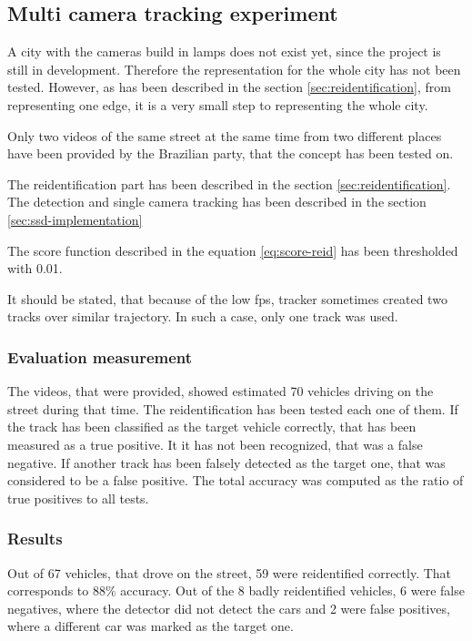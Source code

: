 \documentclass[a4paper,12pt,titlepage, twoside]{article}
\numberwithin{figure}{section}
\begin{document}
\subsection{Multi camera tracking experiment}
\label{sec:multi-camera-tracking}

A city with the cameras build in lamps does not exist yet, since the project is still in development. Therefore the representation for the whole city has not been tested. However, as has been described in the section \ref{sec:reidentification}, from representing one edge, it is a very small step to representing the whole city. 

Only two videos of the same street at the same time from two different places have been provided by the Brazilian party, that the concept has been tested on.

The reidentification part has been described in the section \ref{sec:reidentification}. The detection and single camera tracking has been described in the section \ref{sec:ssd-implementation}

The score function described in the equation \ref{eq:score-reid} has been thresholded with 0.01. 

It should be stated, that because of the low fps, tracker sometimes created two tracks over similar trajectory. In such a case, only one track was used.

\subsubsection{Evaluation measurement}
The videos, that were provided, showed estimated 70 vehicles driving on the street during that time. The reidentification has been tested each one of them. If the track has been classified as the target vehicle correctly, that has been measured as a true positive. It it has not been recognized, that was a false negative. If another track has been falsely detected as the target one, that was considered to be a false positive. The total accuracy was computed as the ratio of true positives to all tests. 

\subsubsection{Results}
Out of 67 vehicles, that drove on the street, 59 were reidentified correctly. That corresponds to 88\% accuracy. Out of the 8 badly reidentified vehicles, 6 were false negatives, where the detector did not detect the cars and 2 were false positives, where a different car was marked as the target one.
\end{document}
